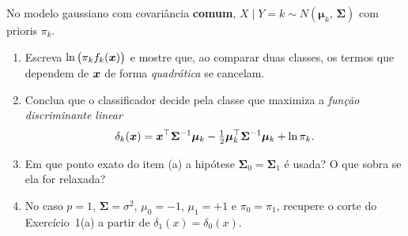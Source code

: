 \documentclass[11pt,a4paper]{article}
\begin{document}
\begin{exercicio}
No modelo gaussiano com covariância \textbf{comum},
$X\mid Y=k \sim N(\bm\mu_k,\,\bm\Sigma)$ com prioris $\pi_k$.
\begin{enumerate}[label=(\alph*),leftmargin=1.1cm]
  \item Escreva $\ln\big(\pi_k f_k(\bm{x})\big)$ e mostre que, ao comparar duas
        classes, os termos que dependem de $\bm{x}$ de forma \emph{quadrática}
        se cancelam.
  \item Conclua que o classificador decide pela classe que maximiza a
        \emph{função discriminante linear}
        \[
          \delta_k(\bm{x}) = \bm{x}^\top\bm\Sigma^{-1}\bm\mu_k
            - \tfrac12\bm\mu_k^\top\bm\Sigma^{-1}\bm\mu_k + \ln\pi_k .
        \]
  \item Em que ponto exato do item (a) a hipótese $\bm\Sigma_0=\bm\Sigma_1$ é
        usada? O que sobra se ela for relaxada?
  \item No caso $p=1$, $\bm\Sigma=\sigma^2$, $\mu_0=-1$, $\mu_1=+1$ e
        $\pi_0=\pi_1$, recupere o corte do Exercício~1(a) a partir de
        $\delta_1(x)=\delta_0(x)$.
\end{enumerate}
\end{exercicio}
\end{document}
